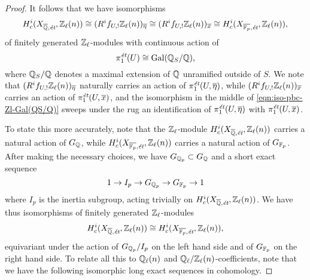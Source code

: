 \documentclass{article}
\numberwithin{equation}{section}
\begin{document}
\begin{proposition}
\begin{proof}
    It follows that we have isomorphisms
    \begin{equation}
      \label{eqn:iso-pbc-Zl-Gal(QS/Q)}
      H^i_c (X_{\overline{\mathbb{Q}}, \text{\it ét}}, \mathbb{Z}_\ell (n)) \cong (R^i f_{U,!} \mathbb{Z}_\ell (n))_{\overline{\eta}} \cong (R^i f_{U,!} \mathbb{Z}_\ell (n))_{\overline{x}} \cong H^i_c (X_{\overline{\mathbb{F}_p}, \text{\it ét}}, \mathbb{Z}_\ell (n)),
    \end{equation}
    of finitely generated $\mathbb{Z}_\ell$-modules with continuous action of
    $$\pi_1^\text{\it ét} (U) \cong \operatorname{Gal} (\mathbb{Q}_S/\mathbb{Q}),$$
    where $\mathbb{Q}_S/\mathbb{Q}$ denotes a maximal extension of $\mathbb{Q}$ unramified outside of
    $S$. We note that $(R^i f_{U,!} \mathbb{Z}_\ell (n))_{\overline{\eta}}$ naturally
    carries an action of $\pi_1^\text{\it ét} (U, \overline{\eta})$, while
    $(R^i f_{U,!} \mathbb{Z}_\ell (n))_{\overline{x}}$ carries an action of
    $\pi_1^\text{\it ét} (U, \overline{x})$, and the isomorphism in the middle
    of \eqref{eqn:iso-pbc-Zl-Gal(QS/Q)} sweeps under the rug an identification
    of $\pi_1^\text{\it ét} (U, \overline{\eta})$ with
    $\pi_1^\text{\it ét} (U, \overline{x})$.

    To state this more accurately, note that the $\mathbb{Z}_\ell$-module
    $H^i_c (X_{\overline{\mathbb{Q}}, \text{\it ét}}, \mathbb{Z}_\ell (n))$ carries a natural
    action of $G_{\mathbb{Q}}$, while
    $H^i_c (X_{\overline{\mathbb{F}_p}, \text{\it ét}}, \mathbb{Z}_\ell (n))$ carries a
    natural action of $G_{\mathbb{F}_p}$. After making the necessary choices, we have
    $G_{\mathbb{Q}_p} \subset G_{\mathbb{Q}}$ and a short exact sequence
    $$1 \to I_p \to G_{\mathbb{Q}_p} \to G_{\mathbb{F}_p} \to 1$$
    where $I_p$ is the inertia subgroup, acting trivially on
    $H^i_c (X_{\overline{\mathbb{Q}}, \text{\it ét}}, \mathbb{Z}_\ell (n))$. We have thus
    isomorphisms of finitely generated $\mathbb{Z}_\ell$-modules
    \[ H^i_c (X_{\overline{\mathbb{Q}}, \text{\it ét}}, \mathbb{Z}_\ell (n)) \cong
    H^i_c (X_{\overline{\mathbb{F}_p}, \text{\it ét}}, \mathbb{Z}_\ell (n)), \]
    equivariant under the action of $G_{\mathbb{Q}_p}/I_p$ on the left hand side and of
    $G_{\mathbb{F}_p}$ on the right hand side. To relate all this to $\mathbb{Q}_\ell (n)$ and
    $\mathbb{Q}_\ell/\mathbb{Z}_\ell (n)$-coefficients, note that we have the following
    isomorphic long exact sequences in cohomology.


\end{proof}
\end{proposition}
\end{document}
